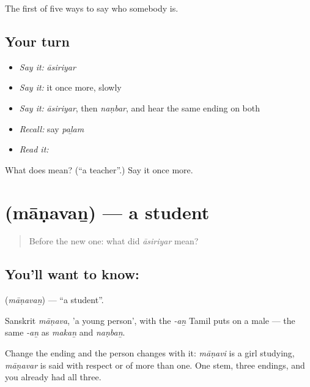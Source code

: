 \begin{grammarlens}[title={What you've built}]
The first of five ways to say who somebody is.
\end{grammarlens}

\subsection*{Your turn}
\begin{itemize}
\raggedright
  \item \emph{Say it:} \emph{āsiriyar}
  \item \emph{Say it:} it once more, slowly
  \item \emph{Say it:} \emph{āsiriyar}, then \emph{naṇbar}, and hear the same ending on both
  \item \emph{Recall:} say \emph{paḻam}
  \item \emph{Read it:} \textbf{}
\end{itemize}

\begin{tcolorbox}[breakable,colback=teal!4,colframe=teal!35!black,title={Before you move on}]
What does  mean? (\textquotedblleft{}a teacher\textquotedblright{}.) Say it once more.
\end{tcolorbox}
\section[\texorpdfstring{\ta{மாணவன்} (māṇavaṉ)}{மாணவன் (māṇavaṉ)}]{ (māṇavaṉ) — a student}

\label{lesson:TA-C46-student}



\begin{quote}
Before the new one: what did \emph{āsiriyar} mean?
\end{quote}

\subsection*{You'll want to know: }
\textbf{} (\emph{māṇavaṉ}) — \textquotedblleft{}a student\textquotedblright{}.

Sanskrit \emph{māṇava}, 'a young person', with the \emph{-aṉ} Tamil puts on a male — the same \emph{-aṉ} as \emph{makaṉ} and \emph{naṇbaṉ}.

Change the ending and the person changes with it: \emph{māṇavi} is a girl studying, \emph{māṇavar} is said with respect or of more than one. One stem, three endings, and you already had all three.

